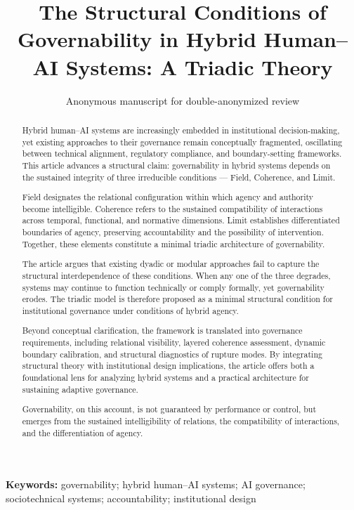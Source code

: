 \documentclass[12pt]{article}
\title{The Structural Conditions of Governability in Hybrid Human–AI Systems: A Triadic Theory}
\author{Anonymous manuscript for double-anonymized review}
\date{}
\begin{document}
\maketitle



\begin{abstract}


Hybrid human–AI systems are increasingly embedded in institutional decision-making, yet existing approaches to their governance remain conceptually fragmented, oscillating between technical alignment, regulatory compliance, and boundary-setting frameworks. This article advances a structural claim: governability in hybrid systems depends on the sustained integrity of three irreducible conditions — Field, Coherence, and Limit.

Field designates the relational configuration within which agency and authority become intelligible. Coherence refers to the sustained compatibility of interactions across temporal, functional, and normative dimensions. Limit establishes differentiated boundaries of agency, preserving accountability and the possibility of intervention. Together, these elements constitute a minimal triadic architecture of governability.

The article argues that existing dyadic or modular approaches fail to capture the structural interdependence of these conditions. When any one of the three degrades, systems may continue to function technically or comply formally, yet governability erodes. The triadic model is therefore proposed as a minimal structural condition for institutional governance under conditions of hybrid agency.

Beyond conceptual clarification, the framework is translated into governance requirements, including relational visibility, layered coherence assessment, dynamic boundary calibration, and structural diagnostics of rupture modes. By integrating structural theory with institutional design implications, the article offers both a foundational lens for analyzing hybrid systems and a practical architecture for sustaining adaptive governance.

Governability, on this account, is not guaranteed by performance or control, but emerges from the sustained intelligibility of relations, the compatibility of interactions, and the differentiation of agency.

\end{abstract}

\noindent\textbf{Keywords:} governability; hybrid human–AI systems; AI governance; sociotechnical systems; accountability; institutional design
\end{document}
